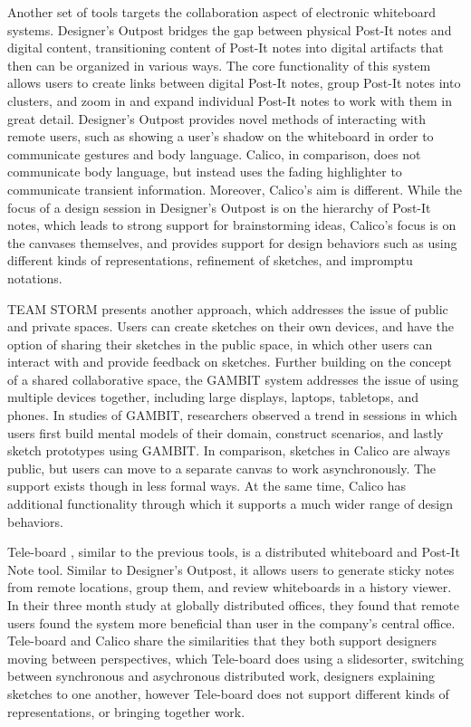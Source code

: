 Another set of tools targets the collaboration aspect of electronic whiteboard systems. Designer's Outpost \citep{klemmer2001designers} bridges the gap between physical Post-It notes and digital content, transitioning content of Post-It notes into digital artifacts that then can be organized in various ways. The core functionality of this system allows users to create links between digital Post-It notes, group Post-It notes into clusters, and zoom in and expand individual Post-It notes to work with them in great detail. Designer's Outpost provides novel methods of interacting with remote users, such as showing a user's shadow on the whiteboard in order to communicate gestures and body language. Calico, in comparison, does not communicate body language, but instead uses the fading highlighter to communicate transient information. Moreover, Calico's aim is different. While the focus of a design session in Designer's Outpost is on the hierarchy of Post-It notes, which leads to strong support for brainstorming ideas, Calico's focus is on the canvases themselves, and provides support for design behaviors such as using different kinds of representations, refinement of sketches, and impromptu notations.

TEAM STORM \citep{Hailpern} presents another approach, which addresses the issue of public and private spaces. Users can create sketches on their own devices, and have the option of sharing their sketches in the public space, in which other users can interact with and provide feedback on sketches. Further building on the concept of a shared collaborative space, the GAMBIT \cite{Sangiorgi:2012:GAM:2305484.2305527} system addresses the issue of using multiple devices together, including large displays, laptops, tabletops, and phones. In studies of GAMBIT, researchers observed a trend in sessions in which users first build mental models of their domain, construct scenarios, and lastly sketch prototypes using GAMBIT. In comparison, sketches in Calico are always public, but users can move to a separate canvas to work asynchronously. The support exists though in less formal ways. At the same time, Calico has additional functionality through which it supports a much wider range of design behaviors. 

Tele-board \cite{Gumienny2013}, similar to the previous tools, is a distributed whiteboard and Post-It Note tool. Similar to Designer's Outpost, it allows users to generate sticky notes from remote locations, group them, and review whiteboards in a history viewer. In their three month study at globally distributed offices, they found that remote users found the system more beneficial than user in the company's central office. Tele-board and Calico share the similarities that they both support designers moving between perspectives, which Tele-board does using a slidesorter, switching between synchronous and asychronous distributed work, designers explaining sketches to one another, however Tele-board does not support different kinds of representations, or bringing together work.

